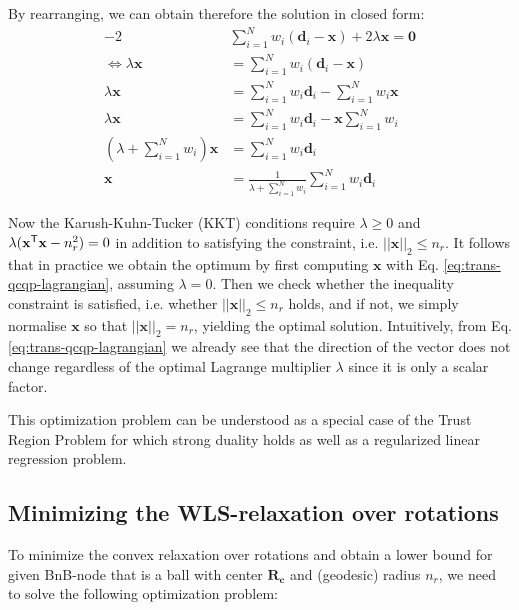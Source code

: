 By rearranging, we can obtain therefore the solution in closed form:
\begin{equation}
	\label{eq:trans-qcqp-lagrangian}
	\begin{aligned}	
		-2  &\sum_{i=1}^{N}  w_i \left(\mathbf{d}_i - \mathbf{x}\right) + 2 \lambda \mathbf{x} = \mathbf{0}\\
		\iff \lambda \mathbf{x} &= \sum_{i=1}^{N} w_i \left(\mathbf{d}_i - \mathbf{x}\right)\\
		\lambda \mathbf{x} &= \sum_{i=1}^{N}  w_i \mathbf{d}_i  - \sum_{i=1}^{N}  w_i \mathbf{x}\\
		\lambda \mathbf{x} &= \sum_{i=1}^{N}  w_i \mathbf{d}_i  - \mathbf{x} \sum_{i=1}^{N}  w_i\\
		\left( \lambda + \sum_{i=1}^{N}  w_i \right) \mathbf{x} &= \sum_{i=1}^{N} w_i \mathbf{d}_i \\
		\mathbf{x} &= \frac{1}{\lambda + \sum_{i=1}^{N}  w_i} \sum_{i=1}^{N} w_i \mathbf{d}_i 
	\end{aligned}
\end{equation}

Now the Karush-Kuhn-Tucker (KKT) conditions require $\lambda \geq 0$ and $\lambda (
\mathbf{x}^{\mathsf{T}} \mathbf{x} - n_r^2) = 0$ in addition to satisfying the constraint, i.e. $|| \mathbf{x}||_2 \leq n_r$. It follows that in practice we obtain the optimum by first computing $\mathbf{x}$ with Eq. \ref{eq:trans-qcqp-lagrangian}, assuming $\lambda = 0$. Then we check whether the inequality constraint is satisfied, i.e. whether $|| \mathbf{x}||_2 \leq n_r$ holds, and if not, we simply normalise $\mathbf{x}$ so that $|| \mathbf{x}||_2 = n_r$, yielding the optimal solution. Intuitively, from Eq. \ref{eq:trans-qcqp-lagrangian} we already see that the direction of the vector does not change regardless of the optimal Lagrange multiplier $\lambda$ since it is only a scalar factor.  

This optimization problem can be understood as a special case of the Trust Region Problem for which strong duality holds \cite[Ch. 5.2, p.229]{Boyd_Vandenberghe_2004} as well as a regularized linear regression problem.



\subsection{Minimizing the WLS-relaxation over rotations}

To minimize the convex relaxation over rotations and obtain a lower bound for given BnB-node that is a ball with center $\mathbf{R_c}$ and (geodesic) radius $n_r$, we need to solve the following optimization problem:

